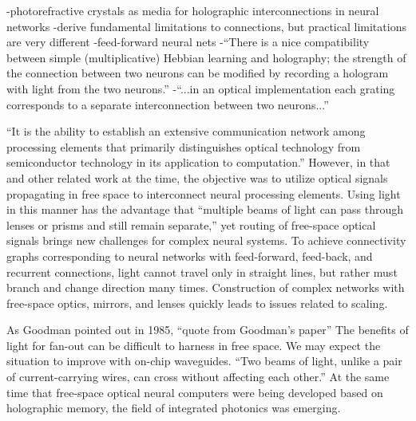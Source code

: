 \vspace{3em}
\cite{psbr1988}
-photorefractive crystals as media for holographic interconnections in neural networks
-derive fundamental limitations to connections, but practical limitations are very different
-feed-forward neural nets
-``There is a nice compatibility between simple (multiplicative) Hebbian learning and holography; the strength of the connection between two neurons can be modified by recording a hologram with light from the two neurons.'' 
-``...in an optical implementation each grating corresponds to a separate interconnection between two neurons...''

\vspace{3em}
\cite{abps1987}
``It is the ability to establish an extensive communication network among processing elements that primarily distinguishes optical technology from semiconductor technology in its application to computation.'' \cite{abps1987} However, in that and other related work at the time, the objective was to utilize optical signals propagating in free space to interconnect neural processing elements. Using light in this manner has the advantage that ``multiple beams of light can pass through lenses or prisms and still remain separate,'' \cite{abps1987} yet routing of free-space optical signals brings new challenges for complex neural systems. To achieve connectivity graphs corresponding to neural networks with feed-forward, feed-back, and recurrent connections, light cannot travel only in straight lines, but rather must branch and change direction many times. Construction of complex networks with free-space optics, mirrors, and lenses quickly leads to issues related to scaling. 

As Goodman pointed out in 1985, ``quote from Goodman's paper'' The benefits of light for fan-out can be difficult to harness in free space. We may expect the situation to improve with on-chip waveguides. ``Two beams of light, unlike a pair of current-carrying wires, can cross without affecting each other.'' \cite{abps1987} At the same time that free-space optical neural computers were being developed based on holographic memory, the field of integrated photonics was emerging.

